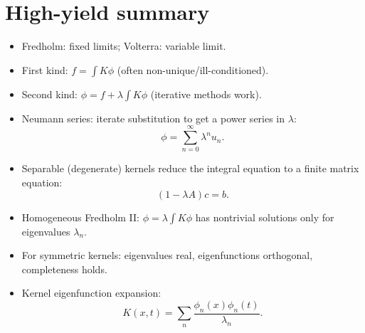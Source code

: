 
\section{High-yield summary}

\begin{itemize}
\item Fredholm: fixed limits; Volterra: variable limit.
\item First kind: $f=\int K\phi$ (often non-unique/ill-conditioned).
\item Second kind: $\phi=f+\lambda\int K\phi$ (iterative methods work).
\item Neumann series: iterate substitution to get a power series in $\lambda$:
\[
\phi=\sum_{n=0}^\infty \lambda^n u_n.
\]
\item Separable (degenerate) kernels reduce the integral equation to a finite matrix equation:
\[
(1-\lambda A)c=b.
\]
\item Homogeneous Fredholm II: $\phi=\lambda\int K\phi$ has nontrivial solutions only for
eigenvalues $\lambda_n$.
\item For symmetric kernels: eigenvalues real, eigenfunctions orthogonal, completeness holds.
\item Kernel eigenfunction expansion:
\[
K(x,t)=\sum_n \frac{\phi_n(x)\phi_n(t)}{\lambda_n}.
\]
\end{itemize}
